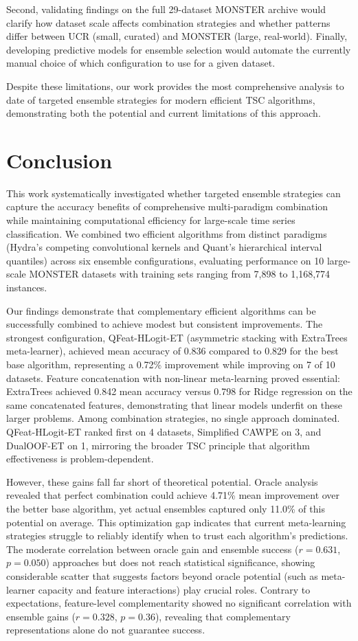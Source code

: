 \documentclass[pdflatex,sn-basic]{sn-jnl}           %
\theoremstyle{thmstyleone}%
\theoremstyle{thmstyletwo}%
\theoremstyle{thmstylethree}%
\begin{document}
Second, validating findings on the full 29-dataset MONSTER archive would clarify how dataset scale affects combination strategies and whether patterns differ between UCR (small, curated) and MONSTER (large, real-world). Finally, developing predictive models for ensemble selection would automate the currently manual choice of which configuration to use for a given dataset.

Despite these limitations, our work provides the most comprehensive analysis to date of targeted ensemble strategies for modern efficient TSC algorithms, demonstrating both the potential and current limitations of this approach.


\section{Conclusion}\label{sec13}

This work systematically investigated whether targeted ensemble strategies can capture the accuracy benefits of comprehensive multi-paradigm combination while maintaining computational efficiency for large-scale time series classification. We combined two efficient algorithms from distinct paradigms (Hydra's competing convolutional kernels and Quant's hierarchical interval quantiles) across six ensemble configurations, evaluating performance on 10 large-scale MONSTER datasets with training sets ranging from 7,898 to 1,168,774 instances.

Our findings demonstrate that complementary efficient algorithms can be successfully combined to achieve modest but consistent improvements. The strongest configuration, QFeat-HLogit-ET (asymmetric stacking with ExtraTrees meta-learner), achieved mean accuracy of 0.836 compared to 0.829 for the best base algorithm, representing a 0.72\% improvement while improving on 7 of 10 datasets. Feature concatenation with non-linear meta-learning proved essential: ExtraTrees achieved 0.842 mean accuracy versus 0.798 for Ridge regression on the same concatenated features, demonstrating that linear models underfit on these larger problems. Among combination strategies, no single approach dominated. QFeat-HLogit-ET ranked first on 4 datasets, Simplified CAWPE on 3, and DualOOF-ET on 1, mirroring the broader TSC principle that algorithm effectiveness is problem-dependent.

However, these gains fall far short of theoretical potential. Oracle analysis revealed that perfect combination could achieve 4.71\% mean improvement over the better base algorithm, yet actual ensembles captured only 11.0\% of this potential on average. This optimization gap indicates that current meta-learning strategies struggle to reliably identify when to trust each algorithm's predictions. The moderate correlation between oracle gain and ensemble success ($r=0.631$, $p=0.050$) approaches but does not reach statistical significance, showing considerable scatter that suggests factors beyond oracle potential (such as meta-learner capacity and feature interactions) play crucial roles. Contrary to expectations, feature-level complementarity showed no significant correlation with ensemble gains ($r=0.328$, $p=0.36$), revealing that complementary representations alone do not guarantee success.
\end{document}
